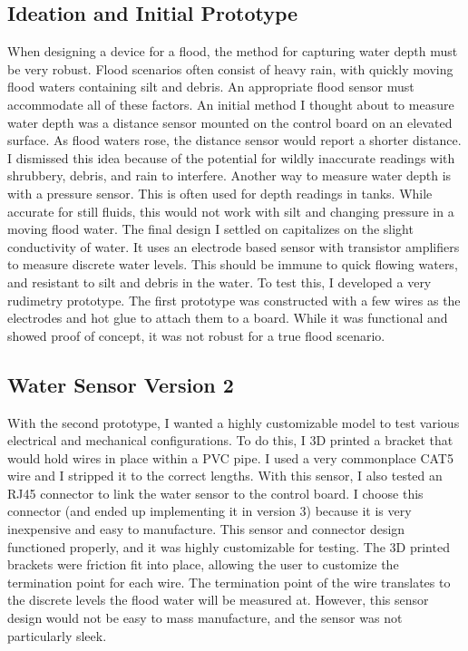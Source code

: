 \documentclass[letter]{article}
\begin{document}
\subsection{Ideation and Initial Prototype} When designing a device for a flood, the method for capturing water depth must be very robust. Flood scenarios often consist of heavy rain, with quickly moving flood waters containing silt and debris. An appropriate flood sensor must accommodate all of these factors. An initial method I thought about to measure water depth was a distance sensor mounted on the control board on an elevated surface. As flood waters rose, the distance sensor would report a shorter distance. I dismissed this idea because of the potential for wildly inaccurate readings with shrubbery, debris, and rain to interfere. Another way to measure water depth is with a pressure sensor. This is often used for depth readings in tanks. While accurate for still fluids, this would not work with silt and changing pressure in a moving flood water. The final design I settled on capitalizes on the slight conductivity of water. It uses an electrode based sensor with transistor amplifiers to measure discrete water levels. This should be immune to quick flowing waters, and resistant to silt and debris in the water. To test this, I developed a very rudimetry prototype. The first prototype was constructed with a few wires as the electrodes and hot glue to attach them to a board. While it was functional and showed proof of concept, it was not robust for a true flood scenario. 

\subsection{Water Sensor Version 2} With the second prototype, I wanted a highly customizable model to test various electrical and mechanical configurations. To do this, I 3D printed a bracket that would hold wires in place within a PVC pipe. I used a very commonplace CAT5 wire and I stripped it to the correct lengths. With this sensor, I also tested an RJ45 connector to link the water sensor to the control board. I choose this connector (and ended up implementing it in version 3) because it is very inexpensive and easy to manufacture. This sensor and connector design functioned properly, and it was highly customizable for testing. The 3D printed brackets were friction fit into place, allowing the user to customize the termination point for each wire. The termination point of the wire translates to the discrete levels the flood water will be measured at. However, this sensor design would not be easy to mass manufacture, and the sensor was not particularly sleek.
\end{document}
